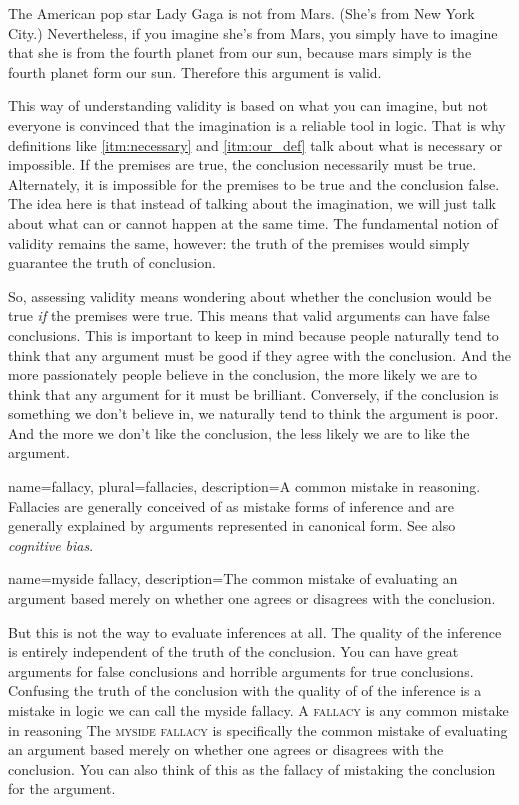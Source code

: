 The American pop star Lady Gaga is not from Mars. (She's from New York City.) Nevertheless, if you imagine she's from Mars, you simply have to imagine that she is from the fourth planet from our sun, because mars simply is the fourth planet form our sun. Therefore this argument is valid. 

This way of understanding validity is based on what you can imagine, but not everyone is convinced that the imagination is a reliable tool in logic. That is why definitions like \ref{itm:necessary} and \ref{itm:our_def} talk about what is necessary or impossible. If the premises are true, the conclusion necessarily must be true. Alternately, it is impossible for the premises to be true and the conclusion false. The idea here is that instead of talking about the imagination, we will just talk about what can or cannot happen at the same time. The fundamental notion of validity remains the same, however: the truth of the premises would simply guarantee the truth of conclusion. 

So, assessing validity means wondering about whether the conclusion would be true \textit{if} the premises were true. This means that valid arguments can have false conclusions. This is important to keep in mind because people naturally tend to think that any argument must be good if they agree with the conclusion. And the more passionately people believe in the conclusion, the more likely we are to think that any argument for it must be brilliant. Conversely, if the conclusion is something we don't believe in, we naturally tend to think the argument is poor. And the more we don't like the conclusion, the less likely we are to like the argument. 

{
name=fallacy,
plural=fallacies,
description={A common mistake in reasoning. Fallacies are generally conceived of as mistake forms of inference and are generally explained by arguments represented in canonical form. See also \emph{cognitive bias}.}
}

{
name=myside fallacy,
description={The common mistake of evaluating an argument based merely on whether one agrees or disagrees with the conclusion.}
}


But this is not the way to evaluate inferences at all. The quality of the inference is entirely independent of the truth of the conclusion. You can have great arguments for false conclusions and horrible arguments for true conclusions. Confusing the truth of the conclusion with the quality of of the inference is a mistake in logic we can call the myside fallacy. A \textsc{\gls{fallacy}} \label{def:fallacy} is any common mistake in reasoning  The \textsc{\gls{myside fallacy}} \label{def:myside_fallacy} is specifically the common mistake of evaluating an argument based merely on whether one agrees or disagrees with the conclusion. You can also think of this as the fallacy of mistaking the conclusion for the argument.

